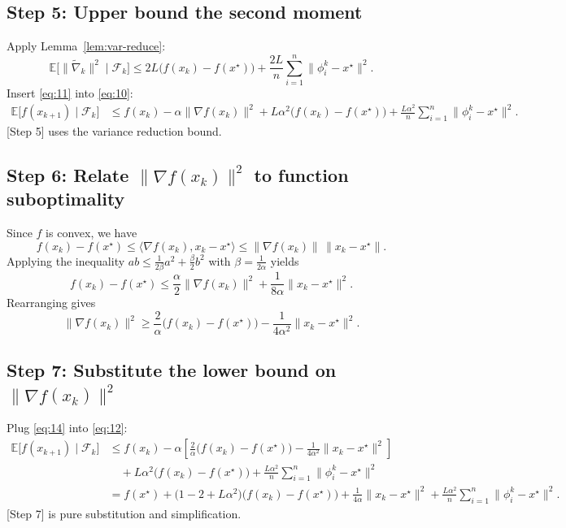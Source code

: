 \documentclass{article}
\begin{document}
\subsection*{Step 5: Upper bound the second moment}
Apply Lemma~\ref{lem:var-reduce}:
\[
\mathbb{E}\!\bigl[\|\tilde\nabla_k\|^{2}\mid\mathcal{F}_k\bigr]
\le 2L\bigl(f(x_k)-f(x^\star)\bigr)
   +\frac{2L}{n}\sum_{i=1}^{n}\|\phi_i^{k}-x^\star\|^{2}.
\tag{11}
\]
Insert \eqref{eq:11} into \eqref{eq:10}:
\begin{align}
\mathbb{E}\!\bigl[f(x_{k+1})\mid\mathcal{F}_k\bigr]
&\le f(x_k)-\alpha\|\nabla f(x_k)\|^{2}
   +L\alpha^{2}\bigl(f(x_k)-f(x^\star)\bigr)
   +\frac{L\alpha^{2}}{n}\sum_{i=1}^{n}\|\phi_i^{k}-x^\star\|^{2}.
\tag{12}
\end{align}
[Step 5] uses the variance reduction bound.

\subsection*{Step 6: Relate $\|\nabla f(x_k)\|^{2}$ to function suboptimality}
Since $f$ is convex, we have
\[
f(x_k)-f(x^\star)\le\langle\nabla f(x_k),x_k-x^\star\rangle
\le \| \nabla f(x_k)\|\,\|x_k-x^\star\|.
\]
Applying the inequality $ab\le\frac{1}{2\beta}a^{2}+\frac{\beta}{2}b^{2}$ with $\beta= \frac{1}{2\alpha}$ yields
\[
f(x_k)-f(x^\star)\le \frac{\alpha}{2}\|\nabla f(x_k)\|^{2}
                     +\frac{1}{8\alpha}\|x_k-x^\star\|^{2}.
\tag{13}
\]
Rearranging gives
\[
\|\nabla f(x_k)\|^{2}\ge \frac{2}{\alpha}\bigl(f(x_k)-f(x^\star)\bigr)
                         -\frac{1}{4\alpha^{2}}\|x_k-x^\star\|^{2}.
\tag{14}
\]

\subsection*{Step 7: Substitute the lower bound on $\|\nabla f(x_k)\|^{2}$}
Plug \eqref{eq:14} into \eqref{eq:12}:
\begin{align}
\mathbb{E}\!\bigl[f(x_{k+1})\mid\mathcal{F}_k\bigr]
&\le f(x_k)-\alpha\!\left[\frac{2}{\alpha}\bigl(f(x_k)-f(x^\star)\bigr)
                         -\frac{1}{4\alpha^{2}}\|x_k-x^\star\|^{2}\right]\nonumber\\
&\quad +L\alpha^{2}\bigl(f(x_k)-f(x^\star)\bigr)
   +\frac{L\alpha^{2}}{n}\sum_{i=1}^{n}\|\phi_i^{k}-x^\star\|^{2}\nonumber\\
&= f(x^\star)+\bigl(1-2+L\alpha^{2}\bigr)\bigl(f(x_k)-f(x^\star)\bigr)
   +\frac{1}{4\alpha}\|x_k-x^\star\|^{2}
   +\frac{L\alpha^{2}}{n}\sum_{i=1}^{n}\|\phi_i^{k}-x^\star\|^{2}.
\tag{15}
\end{align}
[Step 7] is pure substitution and simplification.
\end{document}
